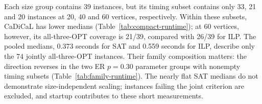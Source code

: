 \begin{table}[htbp]
\centering\small
\caption{Coverage and conditional runtime by graph size.}
\label{tab:compact-runtime}

\end{table}

Each size group contains 39 instances, but its timing subset contains
only 33, 21 and 20 instances at 20, 40 and 60 vertices, respectively.
Within these subsets, CaDiCaL has lower medians
(Table~\ref{tab:compact-runtime}); at 60 vertices, however, its
all-three-OPT coverage is 21/39, compared with 26/39 for ILP.
The pooled medians, 0.373 seconds for SAT and 0.559 seconds for ILP,
describe only the 74 jointly all-three-OPT instances. Their family
composition matters: the direction reverses in the two ER $p=0.30$
parameter groups with nonempty timing subsets
(Table~\ref{tab:family-runtime}). The nearly flat SAT medians do not
demonstrate size-independent scaling; instances failing the joint
criterion are excluded, and startup contributes to these short measurements.
